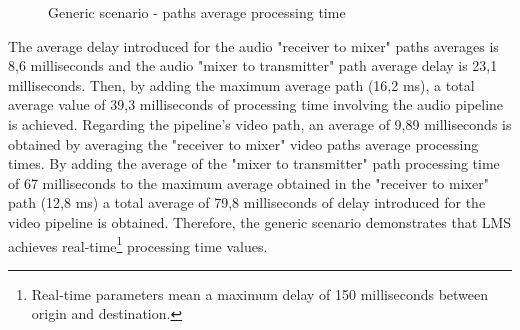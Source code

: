 \begin{figure}[!htb]
  \begin{center}
    \begin{subfigmatrix}{2}
    \end{subfigmatrix}
    \caption{Generic scenario - paths average processing time}
    \label{F:gsavgpt}
  \end{center}
\end{figure}

The average delay introduced for the audio "receiver to mixer" paths averages is 8,6 milliseconds and the audio "mixer to transmitter" path average delay is 23,1 milliseconds. Then, by adding the maximum average path (16,2 ms), a total average value of 39,3 milliseconds of processing time involving the audio pipeline is achieved. Regarding the pipeline's video path, an average of 9,89 milliseconds is obtained by averaging the "receiver to mixer" video paths average processing times. By adding the average of the "mixer to transmitter" path processing time of 67 milliseconds to the maximum average obtained in the "receiver to mixer" path (12,8 ms) a total average of 79,8 milliseconds of delay introduced for the video pipeline is obtained. Therefore, the generic scenario demonstrates that LMS achieves real-time\footnote{Real-time parameters \cite{rtvtnr} mean a maximum delay of 150 milliseconds between origin and destination.} processing time values.

